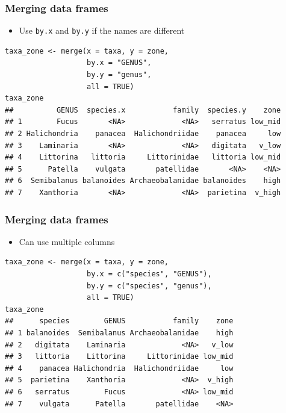 \documentclass{beamer}
\newcommand{\lsting}[1]{\begin{lstlisting}[basicstyle=#1]}
\newcommand{\bi}{\begin{itemize}}
\newcommand{\li}{\item}
\newcommand{\ei}{\end{itemize}}
\newcommand{\bfr}[1]{\begin{frame}[fragile]\frametitle{{ #1 }}}
\begin{document}
\bfr{Merging data frames}
\bi
\li Use \verb|by.x| and \verb|by.y| if the names are different
\ei
\lsting{\tiny}
taxa_zone <- merge(x = taxa, y = zone, 
                   by.x = "GENUS", 
                   by.y = "genus",
                   all = TRUE)
taxa_zone
##          GENUS  species.x           family  species.y    zone
## 1        Fucus       <NA>             <NA>   serratus low_mid
## 2 Halichondria    panacea  Halichondriidae    panacea     low
## 3    Laminaria       <NA>             <NA>   digitata   v_low
## 4    Littorina   littoria     Littorinidae   littoria low_mid
## 5      Patella    vulgata       patellidae       <NA>    <NA>
## 6  Semibalanus balanoides Archaeobalanidae balanoides    high
## 7    Xanthoria       <NA>             <NA>  parietina  v_high
\end{lstlisting}

\end{frame}

\bfr{Merging data frames}
\bi
\li Can use multiple columns
\ei
\lsting{\tiny}
taxa_zone <- merge(x = taxa, y = zone, 
                   by.x = c("species", "GENUS"), 
                   by.y = c("species", "genus"), 
                   all = TRUE)
taxa_zone
##      species        GENUS           family    zone
## 1 balanoides  Semibalanus Archaeobalanidae    high
## 2   digitata    Laminaria             <NA>   v_low
## 3   littoria    Littorina     Littorinidae low_mid
## 4    panacea Halichondria  Halichondriidae     low
## 5  parietina    Xanthoria             <NA>  v_high
## 6   serratus        Fucus             <NA> low_mid
## 7    vulgata      Patella       patellidae    <NA>
\end{lstlisting}

\end{frame}
\end{document}

